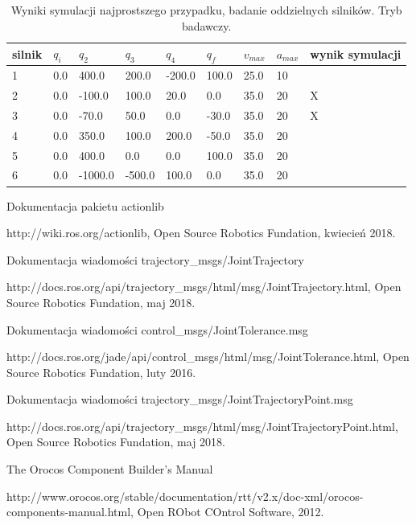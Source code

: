 \documentclass[a4paper, 12pt]{article}
\begin{document}
	\begin{table}[H]
	\centering
	\begin{tabular}{|m{2.5em}|m{3em}|m{3.5em}|m{3em}|m{3em}|m{3em}|m{4em}|m{3em}|m{5em}|}
	\hline
	silnik&$ q_i $ & $ q_2 $ & $ q_3 $ & $q_4$ & $ q_f $ & $ v_{max} $ & $ a_{max} $&wynik symulacji\\
	\hline
	\hline
	\hspace{1em}1& 0.0 & 400.0 & 200.0 & -200.0 & 100.0 & 25.0 & 10&\hspace{2em}\checkmark\\ %
	\hline
	\hspace{1em}2& 0.0 & -100.0 & 100.0 & 20.0 & 0.0 & 35.0 & 20&\hspace{2em}X\\ %
	\hline
	\hspace{1em}3& 0.0 & -70.0 & 50.0 & 0.0 & -30.0 & 35.0 & 20&\hspace{2em}X\\ %
	\hline
	\hspace{1em}4& 0.0 & 350.0 & 100.0 & 200.0 & -50.0 & 35.0 & 20&\hspace{2em}\checkmark\\  %
	\hline
	\hspace{1em}5& 0.0 & 400.0 & 0.0 & 0.0 & 100.0 & 35.0 & 20&\hspace{2em}\checkmark\\  %
	\hline
	\hspace{1em}6& 0.0 & -1000.0 & -500.0 & 100.0 & 0.0 & 35.0 & 20&\hspace{2em}\checkmark\\  %
	\hline
	\end{tabular}
	\caption{Wyniki symulacji najprostszego przypadku, badanie oddzielnych silników. Tryb badawczy.}
	\label{tab:setup6}
	\end{table}	
\newpage	
\begin{thebibliography}{9}
Dokumentacja pakietu actionlib

http://wiki.ros.org/actionlib, Open Source Robotics Fundation, kwiecień 2018.

Dokumentacja wiadomości trajectory\_msgs/JointTrajectory

http://docs.ros.org/api/trajectory\_msgs/html/msg/JointTrajectory.html, Open Source Robotics Fundation, maj 2018.

Dokumentacja wiadomości control\_msgs/JointTolerance.msg

http://docs.ros.org/jade/api/control\_msgs/html/msg/JointTolerance.html, Open Source Robotics Fundation, luty 2016.

Dokumentacja wiadomości trajectory\_msgs/JointTrajectoryPoint.msg

http://docs.ros.org/api/trajectory\_msgs/html/msg/JointTrajectoryPoint.html, Open Source Robotics Fundation, maj 2018.

The Orocos Component Builder's Manual

 http://www.orocos.org/stable/documentation/rtt/v2.x/doc-xml/orocos-components-manual.html, Open RObot COntrol Software, 2012.
\end{thebibliography}	
	
\end{document}
